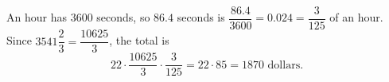 An hour has $3600$ seconds, so $86.4$ seconds is $\dfrac{86.4}{3600}=0.024=\dfrac{3}{125}$ of an hour. Since $3541\dfrac23=\dfrac{10625}{3}$, the total is
\[22\cdot\dfrac{10625}{3}\cdot\dfrac{3}{125}=22\cdot85=\boxed{1870}\text{ dollars}.\]
